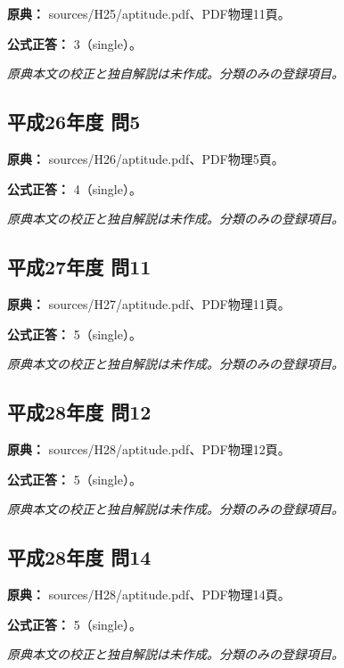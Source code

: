 \noindent\textbf{原典：} sources/H25/aptitude.pdf、PDF物理11頁。

\textbf{公式正答：} 3（single）。

\par\textit{原典本文の校正と独自解説は未作成。分類のみの登録項目。}

\subsection{平成26年度 問5}
\label{q:h26-reg-apt-05}

\noindent\textbf{原典：} sources/H26/aptitude.pdf、PDF物理5頁。

\textbf{公式正答：} 4（single）。

\par\textit{原典本文の校正と独自解説は未作成。分類のみの登録項目。}

\subsection{平成27年度 問11}
\label{q:h27-reg-apt-11}

\noindent\textbf{原典：} sources/H27/aptitude.pdf、PDF物理11頁。

\textbf{公式正答：} 5（single）。

\par\textit{原典本文の校正と独自解説は未作成。分類のみの登録項目。}

\subsection{平成28年度 問12}
\label{q:h28-reg-apt-12}

\noindent\textbf{原典：} sources/H28/aptitude.pdf、PDF物理12頁。

\textbf{公式正答：} 5（single）。

\par\textit{原典本文の校正と独自解説は未作成。分類のみの登録項目。}

\subsection{平成28年度 問14}
\label{q:h28-reg-apt-14}

\noindent\textbf{原典：} sources/H28/aptitude.pdf、PDF物理14頁。

\textbf{公式正答：} 5（single）。

\par\textit{原典本文の校正と独自解説は未作成。分類のみの登録項目。}

